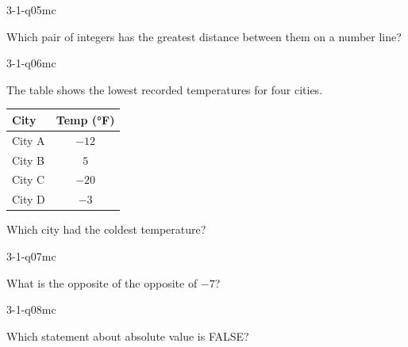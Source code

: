 \begin{practiceQuestion}{3-1-q05}{mc}
\begin{questionText}
Which pair of integers has the greatest distance between them on a number line?
\end{questionText}
\end{practiceQuestion}

\begin{practiceQuestion}{3-1-q06}{mc}
\begin{questionText}
The table shows the lowest recorded temperatures for four cities.

\begin{center}
\begin{tabular}{|l|c|}
\hline
\textbf{City} & \textbf{Temp (°F)} \\
\hline
City A & $-12$ \\ \hline
City B & $5$ \\ \hline
City C & $-20$ \\ \hline
City D & $-3$ \\ \hline
\end{tabular}
\end{center}

Which city had the coldest temperature?
\end{questionText}
\end{practiceQuestion}

\begin{practiceQuestion}{3-1-q07}{mc}
\begin{questionText}
What is the opposite of the opposite of $-7$?
\end{questionText}
\end{practiceQuestion}

\begin{practiceQuestion}{3-1-q08}{mc}
\begin{questionText}
Which statement about absolute value is FALSE?
\end{questionText}
\end{practiceQuestion}

